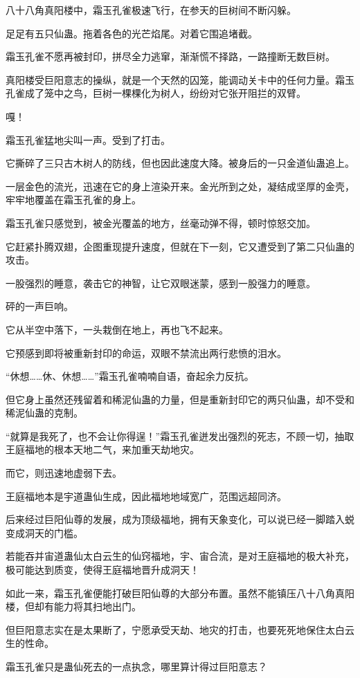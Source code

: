 \begin{this_body}
八十八角真阳楼中，霜玉孔雀极速飞行，在参天的巨树间不断闪躲。

足足有五只仙蛊。拖着各色的光芒焰尾。对着它围追堵截。

霜玉孔雀不愿再被封印，拼尽全力逃窜，渐渐慌不择路，一路撞断无数巨树。

真阳楼受巨阳意志的操纵，就是一个天然的囚笼，能调动关卡中的任何力量。霜玉孔雀成了笼中之鸟，巨树一棵棵化为树人，纷纷对它张开阻拦的双臂。

嘎！

霜玉孔雀猛地尖叫一声。受到了打击。

它撕碎了三只古木树人的防线，但也因此速度大降。被身后的一只金道仙蛊追上。

一层金色的流光，迅速在它的身上渲染开来。金光所到之处，凝结成坚厚的金壳，牢牢地覆盖在霜玉孔雀的身上。

霜玉孔雀只感觉到，被金光覆盖的地方，丝毫动弹不得，顿时惊怒交加。

它赶紧扑腾双翅，企图重现提升速度，但就在下一刻，它又遭受到了第二只仙蛊的攻击。

一股强烈的睡意，袭击它的神智，让它双眼迷蒙，感到一股强力的睡意。

砰的一声巨响。

它从半空中落下，一头栽倒在地上，再也飞不起来。

它预感到即将被重新封印的命运，双眼不禁流出两行悲愤的泪水。

“休想……休、休想……”霜玉孔雀喃喃自语，奋起余力反抗。

但它身上虽然还残留着和稀泥仙蛊的力量，但是重新封印它的两只仙蛊，却不受和稀泥仙蛊的克制。

“就算是我死了，也不会让你得逞！”霜玉孔雀迸发出强烈的死志，不顾一切，抽取王庭福地的根本天地二气，来加重天劫地灾。

而它，则迅速地虚弱下去。

王庭福地本是宇道蛊仙生成，因此福地地域宽广，范围远超同济。

后来经过巨阳仙尊的发展，成为顶级福地，拥有天象变化，可以说已经一脚踏入蜕变成洞天的门槛。

若能吞并宙道蛊仙太白云生的仙窍福地，宇、宙合流，是对王庭福地的极大补充，极可能达到质变，使得王庭福地晋升成洞天！

如此一来，霜玉孔雀便能打破巨阳仙尊的大部分布置。虽然不能镇压八十八角真阳楼，但却有能力将其扫地出门。

但巨阳意志实在是太果断了，宁愿承受天劫、地灾的打击，也要死死地保住太白云生的性命。

霜玉孔雀只是蛊仙死去的一点执念，哪里算计得过巨阳意志？


\end{this_body}
